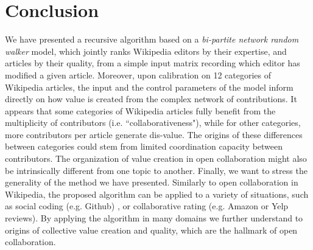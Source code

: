 \section{Conclusion}
We have presented a recursive algorithm based on a {\it bi-partite network random walker} model, which jointly ranks Wikipedia editors by their expertise, and articles by their quality, from a simple input matrix recording which editor has modified a given article. Moreover, upon calibration on 12 categories of Wikipedia articles, the input and the control parameters of the model inform directly on how value is created from the complex network of contributions. It appears that some categories of Wikipedia articles fully benefit from the multiplicity of contributors (i.e. ``collaborativeness"), while for other categories, more contributors per article generate dis-value. The origins of these differences between categories could stem from limited coordination capacity between contributors. The organization of value creation in open collaboration might also be intrinsically different from one topic to another. Finally, we want to stress the generality of the method we have presented. Similarly to open collaboration in Wikipedia, the proposed algorithm can be applied to a variety of situations, such as social coding (e.g. Github) , or collaborative rating (e.g. Amazon or Yelp reviews). By applying the algorithm in many domains we further understand to origins of collective value creation and quality, which are the hallmark of open collaboration.
